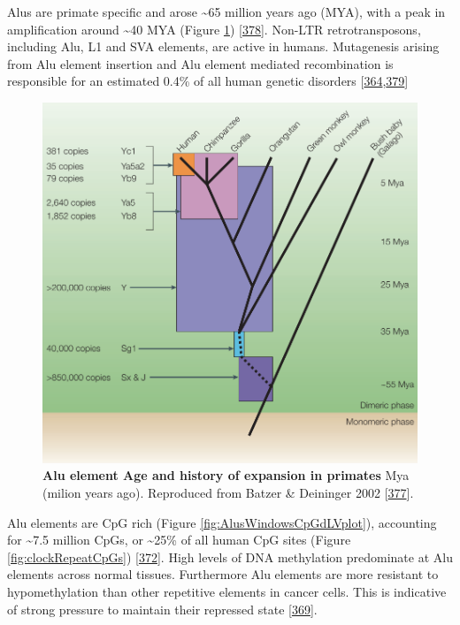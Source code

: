 \documentclass[
]{book}
\begin{document}
Alus are primate specific and arose \textasciitilde65 million years ago (MYA), with a peak in amplification around \textasciitilde40 MYA (Figure \ref{fig:AluAge}) {[}\protect\hyperlink{ref-Ade2013}{378}{]}.
Non-LTR retrotransposons, including Alu, L1 and SVA elements, are active in humans.
Mutagenesis arising from Alu element insertion and Alu element mediated recombination is responsible for an estimated 0.4\% of all human genetic disorders {[}\protect\hyperlink{ref-Kazazian2017}{364},\protect\hyperlink{ref-Belancio2008}{379}{]}

\begin{figure}

{\centering \includegraphics[width=0.9\linewidth]{./figs/Batzer2002_fig2_Alu_age_expansion} 

}

\caption{\textbf{Alu element Age and history of expansion in primates} Mya (milion years ago). Reproduced from Batzer \& Deininger 2002 {[}\protect\hyperlink{ref-Batzer2002}{377}{]}.}\label{fig:AluAge}
\end{figure}



Alu elements are CpG rich (Figure \ref{fig:AlusWindowsCpGdLVplot}), accounting for \textasciitilde7.5 million CpGs, or \textasciitilde25\% of all human CpG sites (Figure \ref{fig:clockRepeatCpGs}) {[}\protect\hyperlink{ref-Deininger2011}{372}{]}.
High levels of DNA methylation predominate at Alu elements across normal tissues.
Furthermore Alu elements are more resistant to hypomethylation than other repetitive elements in cancer cells.
This is indicative of strong pressure to maintain their repressed state {[}\protect\hyperlink{ref-Jorda2017}{369}{]}.
\end{document}
